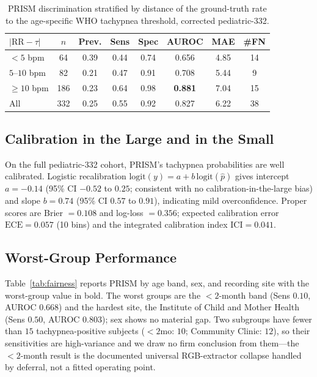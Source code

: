 \begin{table}[!t]\centering\small
\caption{PRISM discrimination stratified by distance of the ground-truth rate to the age-specific WHO
tachypnea threshold, corrected pediatric-332.}
\label{tab:near_threshold}
\setlength{\tabcolsep}{4pt}
\begin{tabular}{@{}lccccccc@{}}
\toprule
$|\mathrm{RR}-\tau|$ & $n$ & Prev. & Sens & Spec & AUROC & MAE & \#FN\\
\midrule
$<5$ bpm     & 64  & 0.39 & 0.44 & 0.74 & 0.656 & 4.85 & 14\\
$5$--$10$ bpm & 82  & 0.21 & 0.47 & 0.91 & 0.708 & 5.44 & 9\\
$\ge 10$ bpm & 186 & 0.23 & 0.64 & 0.98 & \textbf{0.881} & 7.04 & 15\\
\midrule
All          & 332 & 0.25 & 0.55 & 0.92 & 0.827 & 6.22 & 38\\
\bottomrule
\end{tabular}
\end{table}

\subsection{Calibration in the Large and in the Small}
On the full pediatric-332 cohort, PRISM's tachypnea probabilities are well calibrated. Logistic
recalibration $\mathrm{logit}(y)=a+b\,\mathrm{logit}(\hat p)$ gives intercept $a=-0.14$ (95\% CI $-0.52$ to
$0.25$; consistent with no calibration-in-the-large bias) and slope $b=0.74$ (95\% CI $0.57$ to $0.91$),
indicating mild overconfidence. Proper scores are Brier $=0.108$ and log-loss $=0.356$; expected
calibration error $\mathrm{ECE}=0.057$ (10 bins) and the integrated calibration index $\mathrm{ICI}=0.041$.

\subsection{Worst-Group Performance}
Table~\ref{tab:fairness} reports PRISM by age band, sex, and recording site with the worst-group value in
bold. The worst groups are the $<2$-month band (Sens $0.10$, AUROC $0.668$) and the hardest site, the
Institute of Child and Mother Health (Sens $0.50$, AUROC $0.803$); sex shows no material gap. Two subgroups
have fewer than $15$ tachypnea-positive subjects ($<2$mo: $10$; Community Clinic: $12$), so their
sensitivities are high-variance and we draw no firm conclusion from them---the $<2$-month result is the
documented universal RGB-extractor collapse handled by deferral, not a fitted operating point.

